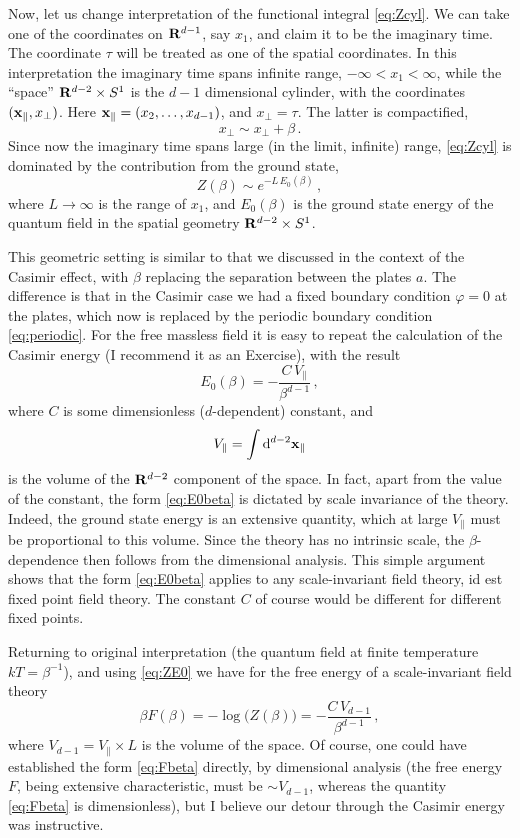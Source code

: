 Now, let us change interpretation of the functional integral \eqref{eq:Zcyl}. We
can take one of the coordinates on $\mathbf{R}^{d-1}$, say $x_1$, and claim it to be the
imaginary time. The coordinate $\tau$ will be treated as one of the spatial
coordinates. In this interpretation the imaginary time spans infinite range,
$-\infty<x_1<\infty$, while the ``space'' $\mathbf{R}^{d-2}\times S^1$ is the $d-1$
dimensional cylinder, with the coordinates $(\mathbf{x}_\parallel,x_\perp)$. Here
$\mathbf{x}_\parallel=(x_2,\dots,x_{d-1})$, and $x_\perp=\tau$. The latter is
compactified,
\[
x_\perp\sim x_\perp+\beta\,.
\]
Since now the imaginary time spans large (in the limit, infinite) range,
\eqref{eq:Zcyl} is dominated by the contribution from the ground state,
\begin{equation}\label{eq:ZE0}
Z(\beta)\sim e^{-L\,E_0(\beta)}\,,
\end{equation}
where $L\to\infty$ is the range of $x_1$, and $E_0(\beta)$ is the ground state
energy of the quantum field in the spatial geometry $\mathbf{R}^{d-2}\times S^1$.

This geometric setting is similar to that we discussed in the context of the
Casimir effect, with $\beta$ replacing the separation between the plates $a$. The
difference is that in the Casimir case we had a fixed boundary condition
$\varphi=0$ at the plates, which now is replaced by the periodic boundary condition
\eqref{eq:periodic}. For the free massless field it is easy to repeat the
calculation of the Casimir energy (I recommend it as an Exercise), with the result
\begin{equation}\label{eq:E0beta}
E_0(\beta)=-\frac{C\,V_\parallel}{\beta^{d-1}}\,,
\end{equation}
where $C$ is some dimensionless ($d$-dependent) constant, and
\[
V_\parallel=\int \mathop{}\!\mathrm{d}^{d-2}\mathbf{x}_\parallel
\]
is the volume of the $\mathbf{R}^{d-2}$ component of the space. In fact, apart from the
value of the constant, the form \eqref{eq:E0beta} is dictated by scale invariance
of the theory. Indeed, the ground state energy is an extensive quantity, which at
large $V_\parallel$ must be proportional to this volume. Since the theory has no
intrinsic scale, the $\beta$-dependence then follows from the dimensional analysis.
This simple argument shows that the form \eqref{eq:E0beta} applies to any
scale-invariant field theory, id est fixed point field theory. The constant $C$ of
course would be different for different fixed points.

Returning to original interpretation (the quantum field at finite temperature
$kT=\beta^{-1}$), and using \eqref{eq:ZE0} we have for the free energy of a
scale-invariant field theory
\begin{equation}\label{eq:Fbeta}
\beta F(\beta)=-\log\bigl(Z(\beta)\bigr)=-\frac{C\,V_{d-1}}{\beta^{d-1}}\,,
\end{equation}
where $V_{d-1}=V_\parallel\times L$ is the volume of the space. Of course, one could
have established the form \eqref{eq:Fbeta} directly, by dimensional analysis (the
free energy $F$, being extensive characteristic, must be $\sim V_{d-1}$, whereas
the quantity \eqref{eq:Fbeta} is dimensionless), but I believe our detour through
the Casimir energy was instructive.

